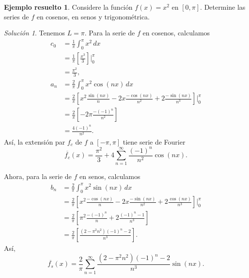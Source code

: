 \documentclass[11pt,letterpaper,draft]{report}
\theoremstyle{plain}
\theoremstyle{definition}
\newtheorem{solved}[theorem]{Ejemplo resuelto}
\theoremstyle{remark}
\newtheorem*{solution}{Solución}
\newcommand\<{\langle}
\renewcommand\>{\rangle}
\begin{document}
\begin{solved}
  Considere la función $f(x)=x^{2}$ en $[0,\pi]$. Determine las
  series de $f$ en cosenos, en senos y trigonométrica.
  \begin{solution}
    Tenemos $L=\pi$. Para la serie de $f$ en cosenos, calculamos
    \begin{align*}
      c_0
      &= \frac{1}{\pi}\int_{0}^{\pi}x^{2}\,dx \\
      &= \frac{1}{\pi} \left[
        \frac{x^{3}}{3}
      \right]\Big|_{0}^{\pi} \\
      &= \frac{\pi^{2}}{3}, \\
      a_n
      &= \frac{2}{\pi}\int_{0}^{\pi}x^{2}\cos(nx)\,dx \\
      &= \frac{2}{\pi} \left[
        x^{2}\frac{\sin(nx)}{n}
        -2x\frac{-\cos(nx)}{n^{2}}
        +2\frac{-\sin(nx)}{n^{3}}
      \right]\Big|_{0}^{\pi} \\
      &= \frac{2}{\pi} \left[
        -2\pi\frac{-(-1)^{n}}{n^{2}}
      \right] \\
      &= \frac{4(-1)^{n}}{n^{2}}.
    \end{align*}
    Así, la extensión par $f_c$ de $f$ a $[-\pi,\pi]$ tiene serie de
    Fourier
    \[
      \overline{f_c}(x)
      =
      \frac{\pi^{2}}{3}
      +
      4\sum_{n=1}^{\infty}\frac{(-1)^{n}}{n^{2}}\cos(nx)
    .\]
    
    Ahora, para la serie de $f$ en senos, calculamos
    \begin{align*}
      b_n
      &= \frac{2}{\pi}\int_{0}^{\pi}x^{2}\sin(nx)\,dx \\
      &= \frac{2}{\pi} \left[
        x^{2}\frac{-\cos(nx)}{n}
        -2x\frac{-\sin(nx)}{n^{2}}
        +2\frac{\cos(nx)}{n^{3}}
      \right]\Big|_{0}^{\pi} \\
      &= \frac{2}{\pi} \left[
        \pi^{2}\frac{-(-1)^{n}}{n}+2\frac{(-1)^{n}-1}{n^{3}}
      \right] \\
      &= \frac{2}{\pi} \left[
        \frac{(2-\pi^{2}n^{2})(-1)^{n}-2}{n^{3}}
      \right].
    \end{align*}
    Así,
    \[
      \overline{f_s}(x)
      =
      \frac{2}{\pi}\sum_{n=1}^{\infty}
        \frac{(2-\pi^{2}n^{2})(-1)^{n}-2}{n^{3}}
        \sin(nx)
    .\]
    

\end{solution}
\end{solved}
\end{document}
